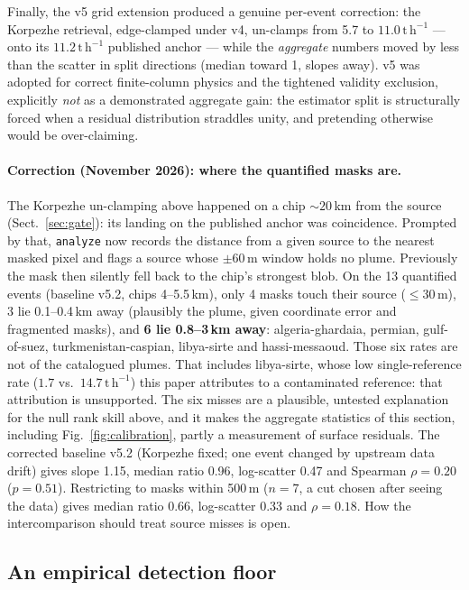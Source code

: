 \documentclass[11pt]{article}
\newcommand{\perh}{\ensuremath{\,\mathrm{t\,h^{-1}}}}
\newcommand{\code}[1]{\texttt{\small #1}}
\begin{document}
Finally, the v5 grid extension produced a genuine per-event correction:
the Korpezhe retrieval, edge-clamped under v4, un-clamps from 5.7 to
$11.0\perh$ --- onto its $11.2\perh$ published anchor --- while the
\emph{aggregate} numbers moved by less than the scatter in split
directions (median toward 1, slopes away). v5 was adopted for correct
finite-column physics and the tightened validity exclusion, explicitly
\emph{not} as a demonstrated aggregate gain: the estimator split is
structurally forced when a residual distribution straddles unity, and
pretending otherwise would be over-claiming.

\paragraph{Correction (November 2026): where the quantified masks are.}
The Korpezhe un-clamping above happened on a chip ${\sim}20$\,km from
the source (Sect.~\ref{sec:gate}): its landing on the published anchor
was coincidence. Prompted by that, \code{analyze} now records the
distance from a given source to the nearest masked pixel and flags a
source whose ${\pm}60$\,m window holds no plume. Previously the mask then
silently fell back to the chip's strongest blob. On the 13 quantified
events (baseline v5.2, chips 4--5.5\,km), only 4 masks touch their
source (${\le}30$\,m), 3 lie 0.1--0.4\,km away (plausibly the plume,
given coordinate error and fragmented masks), and \textbf{6 lie
0.8--3\,km away}: algeria-ghardaia, permian, gulf-of-suez,
turkmenistan-caspian, libya-sirte and hassi-messaoud. Those six rates
are not of the catalogued plumes. That includes libya-sirte, whose low
single-reference rate ($1.7$ vs.\ $14.7\perh$) this paper attributes to a
contaminated reference: that attribution is unsupported. The six misses are a plausible, untested
explanation for the null rank skill above, and it makes the aggregate
statistics of this section, including Fig.~\ref{fig:calibration},
partly a measurement of surface residuals. The corrected baseline v5.2
(Korpezhe fixed; one event changed by upstream data drift) gives slope
1.15, median ratio 0.96, log-scatter 0.47 and Spearman $\rho = 0.20$
($p = 0.51$). Restricting to masks within 500\,m ($n = 7$, a cut chosen
after seeing the data) gives median ratio 0.66, log-scatter 0.33 and
$\rho = 0.18$. How the intercomparison should treat source misses is
open.

\subsection{An empirical detection floor}\label{sec:floor}
\end{document}
